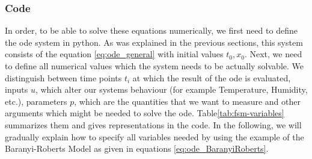 \documentclass[10pt,A4paper]{article}
\begin{document}
\subsubsection*{Code}
In order, to be able to solve these equations numerically, we first need to define the \ac{ode} system in python.
As was explained in the previous sections, this system consists of the equation \ref{eq:ode_general} with initial values $t_0,x_0$.
Next, we need to define all numerical values which the system needs to be actually solvable.
We distinguish between time points $t_i$ at which the result of the \ac{ode} is evaluated, inputs $u$, which alter our systems behaviour (for example Temperature, Humidity, etc.), parameters $p$, which are the quantities that we want to measure and other arguments which might be needed to solve the \ac{ode}.
Table\ref{tab:fsm-variables} summarizes them and gives representations in the code.
In the following, we will gradually explain how to specify all variables needed by using the example of the Baranyi-Roberts Model as given in equations \ref{eq:ode_BaranyiRoberts}.
\end{document}

